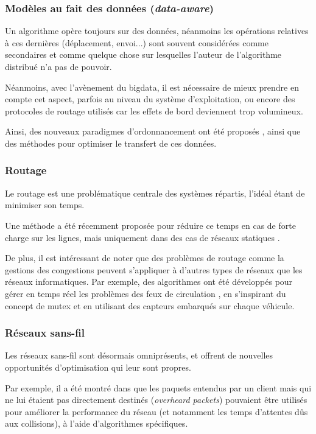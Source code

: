 \subsubsection{Modèles au fait des données (\textit{data-aware})}
Un algorithme opère toujours sur des données, néanmoins les opérations relatives à ces dernières (déplacement, envoi...) sont souvent considérées comme secondaires et comme quelque chose sur lesquelles l'auteur de l'algorithme distribué n'a pas de pouvoir.

Néanmoins, avec l'avènement du \gls{bigdata}, il est nécessaire de mieux prendre en compte cet aspect, parfois au niveau du système d'exploitation, ou encore des protocoles de routage utilisés \cite{baehni2004dependable} car les effets de bord deviennent trop volumineux.

Ainsi, des nouveaux paradigmes d'ordonnancement ont été proposés \cite{yildirim2012data, kosar2009paradigm}, ainsi que des méthodes pour optimiser le transfert de ces données.

\subsubsection{Routage}
Le routage est une problématique centrale des systèmes répartis, l'idéal étant de minimiser son temps.

Une méthode a été récemment proposée pour réduire ce temps en cas de forte charge sur les lignes, mais uniquement dans des cas de réseaux statiques \cite{jeon2014fully}.


De plus, il est intéressant de noter que des problèmes de routage comme la gestions des congestions peuvent s'appliquer à d'autres types de réseaux que les réseaux informatiques. Par exemple, des algorithmes ont été développés pour gérer en temps réel les problèmes des feux de circulation \cite{aoxue2014distributed}, en s'inspirant du concept de \gls{mutex} et en utilisant des capteurs embarqués sur chaque véhicule.

\subsubsection{Réseaux sans-fil}
Les réseaux sans-fil sont désormais omniprésents, et offrent de nouvelles opportunités d'optimisation qui leur sont propres.

Par exemple, il a été montré dans \cite{hosseinabadi2014exploiting} que les paquets entendus par un client mais qui ne lui étaient pas directement destinés (\textit{overheard packets}) pouvaient être utilisés pour améliorer la performance du réseau (et notamment les temps d'attentes dûs aux collisions), à l'aide d'algorithmes spécifiques.


